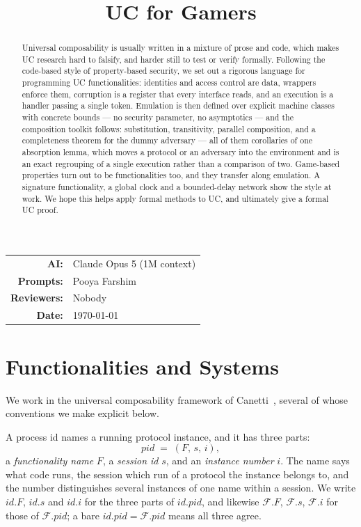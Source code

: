 \documentclass[11pt,a4paper]{article}
\title{\textbf{UC for Gamers}}
\author{}
\date{}
\makeatletter
\newcommand{\AIModelsUsed}{Claude Opus 5 (1M context)}
\newcommand{\PromptedBy}{Pooya Farshim}
\newcommand{\ReviewedBy}{Nobody}
\newcommand{\PaperDate}{\today}
\newcommand{\AIDisclosure}{%
  \begingroup
  \small\centering
  \begin{tabular}{@{}rl@{}}
    \textbf{AI:} & \AIModelsUsed \\
    \textbf{Prompts:} & \PromptedBy \\
    \textbf{Reviewers:} & \ReviewedBy \\
    \textbf{Date:} & \PaperDate \\
  \end{tabular}
  \par
  \endgroup
}
\newcommand{\PID}{\mathit{pid}}
\newcommand{\F}{\mathcal{F}}
\newcommand{\id}{id}
\theoremstyle{accentdef}
\theoremstyle{accentplain}
\makeatother
\begin{document}
\maketitle
\AIDisclosure
\bigskip

\begin{abstract}
Universal composability is usually written in a mixture of prose and code, which makes UC
research hard to falsify, and harder still to test or verify formally. Following the code-based
style of property-based security, we set out a rigorous language for programming UC
functionalities: identities and access control are data, wrappers enforce them, corruption is a
register that every interface reads, and an execution is a handler passing a single token.
Emulation is then defined over explicit machine classes with concrete bounds --- no security
parameter, no asymptotics --- and the composition toolkit follows: substitution, transitivity,
parallel composition, and a completeness theorem for the dummy adversary --- all of them corollaries
of one absorption lemma, which moves a protocol or an adversary into the environment and is an exact
regrouping of a single execution rather than a comparison of two. Game-based properties turn out to be
functionalities too, and they transfer along emulation. A signature functionality, a global
clock and a bounded-delay network show the style at work. We hope this helps apply formal methods to UC, and ultimately give a formal UC
proof.
\end{abstract}

{\setlength{\parskip}{0pt}\small\tableofcontents}
\medskip

\section{Functionalities and Systems}\label{sec:functionalities}

We work in the universal composability framework of Canetti~\cite{Canetti20}, several of whose
conventions we make explicit below.

A process id names a running protocol instance, and it has three parts:
\[
  \PID \;=\; (F,\, s,\, i) ,
\]
a \emph{functionality name} $F$, a \emph{session id} $s$, and an \emph{instance number} $i$. The
name says what code runs, the session which run of a protocol the instance belongs to, and the
number distinguishes several instances of one name within a session. We write $\id.F$,
$\id.s$ and $\id.i$ for the three parts of $\id.\PID$, and likewise $\F.F$, $\F.s$, $\F.i$ for
those of $\F.\PID$; a bare $\id.\PID = \F.\PID$ means all three agree.
\end{document}
